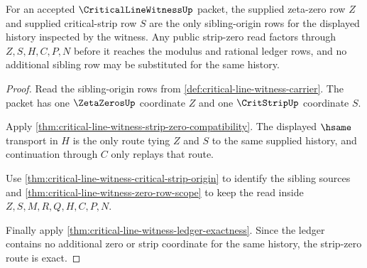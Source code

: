 \begin{theorem}
\label{thm:critical-line-witness-strip-zero-route-exactness}
For an accepted $\CriticalLineWitnessUp$ packet, the supplied zeta-zero row $Z$ and supplied critical-strip row $S$ are the only sibling-origin rows for the displayed history inspected by the witness. Any public strip-zero read factors through $Z,S,H,C,P,N$ before it reaches the modulus and rational ledger rows, and no additional sibling row may be substituted for the same history.
\end{theorem}
\begin{proof}
Read the sibling-origin rows from \autoref{def:critical-line-witness-carrier}. The packet has one $\ZetaZerosUp$ coordinate $Z$ and one $\CritStripUp$ coordinate $S$.

Apply \autoref{thm:critical-line-witness-strip-zero-compatibility}. The displayed $\hsame$ transport in $H$ is the only route tying $Z$ and $S$ to the same supplied history, and continuation through $C$ only replays that route.

Use \autoref{thm:critical-line-witness-critical-strip-origin} to identify the sibling sources and \autoref{thm:critical-line-witness-zero-row-scope} to keep the read inside $Z,S,M,R,Q,H,C,P,N$.

Finally apply \autoref{thm:critical-line-witness-ledger-exactness}. Since the ledger contains no additional zero or strip coordinate for the same history, the strip-zero route is exact.
\end{proof}

